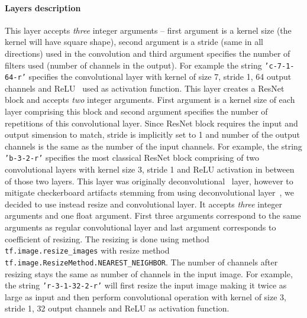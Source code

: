 \paragraph{Layers description}
\begin{description}
 This layer accepts {\em three} integer arguments -- first argument is a kernel size (the kernel will have square shape), second argument is a stride (same in all directions) used in the convolution and third argument specifies the number of filters used (number of channels in the output). For example the string \texttt{'c-7-1-64-r'} specifies the convolutional layer with kernel of size 7, stride 1, 64 output channels and ReLU~\cite{relu} used as activation function.
 This layer creates a ResNet block and accepts {\em two} integer arguments. First argument is a kernel size of each layer comprising this block and second argument specifies the number of repetitions of this convolutional layer. Since ResNet block requires the input and output simension to match, stride is implicitly set to 1 and number of the output channels is the same as the number of the input channels. For example, the string \texttt{'b-3-2-r'} specifies the most classical ResNet block comprising of two convolutional layers with kernel size 3, stride 1 and ReLU activation in between of those two layers.
 This layer was originally deconvolutional~\cite{deconv} layer, however to mitigate checkerboard artifacts stemming from using deconvolutional layer~\cite{resizeconv}, we decided to use instead resize and convolutional layer. It accepts {\em three} integer arguments and one float argument. First three arguments correspond to the same arguments as regular convolutional layer and last argument corresponds to coefficient of resizing. The resizing is done using method \texttt{tf.image.resize\_images} with resize method \texttt{tf.image.ResizeMethod.NEAREST\_NEIGHBOR}. The number of channels after resizing stays the same as number of channels in the input image. For example, the string \texttt{'r-3-1-32-2-r'} will first resize the input image making it twice as large as input and then perform convolutional operation with kernel of size 3, stride 1, 32 output channels and ReLU as activation function.
\end{description}

